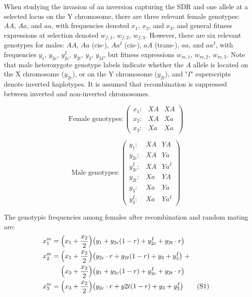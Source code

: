 \documentclass[11pt]{article}
\newcommand\numberthis{\addtocounter{equation}{1}\tag{\theequation}}
\begin{document}
When studying the invasion of an inversion capturing the SDR and one allele at a selected locus on the Y chromosome, there are three relevant female genotypes: $AA$, $Aa$, and $aa$, with frequencies denoted $x_1$, $x_2$, and $x_3$, and general fitness expressions at selection denoted $w_{f,1}$, $w_{f,2}$, $w_{f,3}$. However, there are six relevant genotypes for males: $AA$, $Aa$ (cis-), $Aa^I$ (cis-), $aA$ (trans-), $aa$, and $aa^I$, with frequencies $y_{1}$, $y_{2c}$, $y^I_{2c}$, $y_{2t}$, $y_{3}$, $y_{3I}$, but fitness expressions $w_{m,1}$, $w_{m,2}$, $w_{m,3}$. Note that male heterozygote genotype labels indicate whether the $A$ allele is located on the X chromosome ($y_{2c}$), or on the Y chromosome ($y_{2t}$), and "$I$" superscripts denote inverted haplotypes. It is assumed that recombination is suppressed between inverted and non-inverted chromosomes.

\begin{equation*}
	\text{Female genotypes}:\left( \begin{array}{cc|c}
		x_1: & XA & XA \\
		x_2: & XA & Xa \\
		x_3: & Xa & Xa 
	\end{array} \right)
\end{equation*}

\begin{equation*}
	\text{Male genotypes}:\left( \begin{array}{cc|c}
		y_1:     & XA & YA \\
		y_{2c}:   & XA & Ya \\
		y^I_{2c}: & XA & Ya^I \\
		y_{2t}:   & Xa & YA \\
		y_{3}:    & Xa & Ya \\
		y^I_{3}:  & Xa & Ya^I 
	\end{array} \right)
\end{equation*}

\noindent The genotypic frequencies among females after recombination and random mating are:
\begin{align*}
	x^m_{1} &= \Big( x_1 + \frac{x_2}{2} \Big) \big(y_1 + y_{2c}(1 - r) + y^I_{2c} + y_{2t} \cdot r \big) \\
	x^m_{2} &= \Big( x_1 + \frac{x_2}{2} \Big) \big( y_{2c} \cdot r + y_{2t}(1 - r) + y_3 + y^I_3 \big)~+ \\
	&~~~~\Big( x_3 + \frac{x_2}{2} \Big) \big( y_{1} + y_{2c}(1 - r) + y^I_{2c} + y_{2t} \cdot r \big)      \\
	x^m_{3} &= \Big( x_3 + \frac{x_2}{2} \Big) \big(y_{2c} \cdot r + y{2t}(1 - r) + y_{3} + y^I_3  \big) \numberthis
\end{align*}
\end{document}
